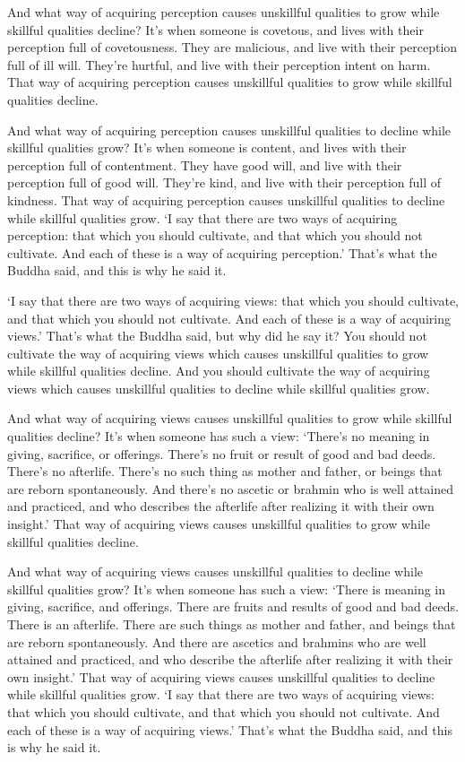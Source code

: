 \documentclass[12pt,openany]{book}%
\begin{document}
And what way of acquiring perception causes unskillful qualities to grow while skillful qualities decline? It’s when someone is covetous, and lives with their perception full of covetousness. They are malicious, and live with their perception full of ill will. They’re hurtful, and live with their perception intent on harm. That way of acquiring perception causes unskillful qualities to grow while skillful qualities decline. 

And what way of acquiring perception causes unskillful qualities to decline while skillful qualities grow? It’s when someone is content, and lives with their perception full of contentment. They have good will, and live with their perception full of good will. They’re kind, and live with their perception full of kindness. That way of acquiring perception causes unskillful qualities to decline while skillful qualities grow. ‘I say that there are two ways of acquiring perception: that which you should cultivate, and that which you should not cultivate. And each of these is a way of acquiring perception.’ That’s what the Buddha said, and this is why he said it. 

‘I say that there are two ways of acquiring views: that which you should cultivate, and that which you should not cultivate. And each of these is a way of acquiring views.’ That’s what the Buddha said, but why did he say it? You should not cultivate the way of acquiring views which causes unskillful qualities to grow while skillful qualities decline. And you should cultivate the way of acquiring views which causes unskillful qualities to decline while skillful qualities grow. 

And what way of acquiring views causes unskillful qualities to grow while skillful qualities decline? It’s when someone has such a view: ‘There’s no meaning in giving, sacrifice, or offerings. There’s no fruit or result of good and bad deeds. There’s no afterlife. There’s no such thing as mother and father, or beings that are reborn spontaneously. And there’s no ascetic or brahmin who is well attained and practiced, and who describes the afterlife after realizing it with their own insight.’ That way of acquiring views causes unskillful qualities to grow while skillful qualities decline. 

And what way of acquiring views causes unskillful qualities to decline while skillful qualities grow? It’s when someone has such a view: ‘There is meaning in giving, sacrifice, and offerings. There are fruits and results of good and bad deeds. There is an afterlife. There are such things as mother and father, and beings that are reborn spontaneously. And there are ascetics and brahmins who are well attained and practiced, and who describe the afterlife after realizing it with their own insight.’ That way of acquiring views causes unskillful qualities to decline while skillful qualities grow. ‘I say that there are two ways of acquiring views: that which you should cultivate, and that which you should not cultivate. And each of these is a way of acquiring views.’ That’s what the Buddha said, and this is why he said it. 
\end{document}
